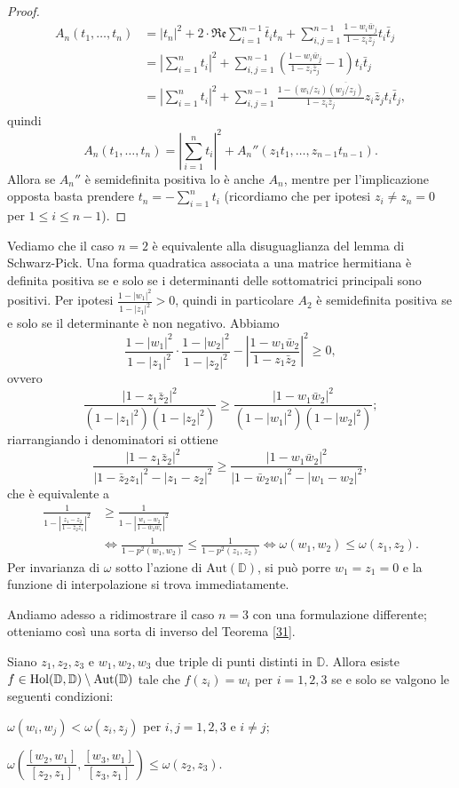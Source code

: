 \begin{proof}
\begin{align*}
    A_n(t_1,\dots,t_n)&=|t_n|^2+2\cdot\mathfrak{Re}\sum_{i=1}^{n-1}\bar{t}_it_n+\sum_{i,j=1}^{n-1}\frac{1-w_i\bar{w}_j}{1-z_i\bar{z}_j}t_i\bar{t}_j \\
    &=\left|\sum_{i=1}^n t_i\right|^2+\sum_{i,j=1}^{n-1}\left(\frac{1-w_i\bar{w}_j}{1-z_i\bar{z}_j}-1\right)t_i\bar{t}_j \\
    &=\left|\sum_{i=1}^n t_i\right|^2+\sum_{i,j=1}^{n-1}\frac{1-(w_i/z_i)\overline{(w_j/z_j)}}{1-z_i\bar{z}_j}z_i\bar{z}_jt_i\bar{t}_j,
  \end{align*}
  quindi
  $$A_n(t_1,\dots,t_n)=\left|\sum_{i=1}^n t_i\right|^2+A_n''(z_1t_1,\dots,z_{n-1}t_{n-1}).$$
  Allora se $A_n''$ è semidefinita positiva lo è anche $A_n$, mentre per l'implicazione opposta basta prendere $\displaystyle t_n=-\sum_{i=1}^n t_i$ (ricordiamo che per ipotesi $z_i\not=z_n=0$ per $1 \le i \le n-1$).
\end{proof}

Vediamo che il caso $n=2$ è equivalente alla disuguaglianza del lemma di Schwarz-Pick. Una forma quadratica associata a una matrice hermitiana è definita positiva se e solo se i determinanti delle sottomatrici principali sono positivi. Per ipotesi $\frac{1-|w_1|^2}{1-|z_1|^2} > 0$, quindi in particolare $A_2$ è semidefinita positiva se e solo se il determinante è non negativo. Abbiamo
$$\frac{1-|w_1|^2}{1-|z_1|^2}\cdot\frac{1-|w_2|^2}{1-|z_2|^2}-\left|\frac{1-w_1\bar{w}_2}{1-z_1\bar{z}_2}\right|^2 \ge 0,$$
ovvero
$$\frac{|1-z_1\bar{z}_2|^2}{(1-|z_1|^2)(1-|z_2|^2)} \ge \frac{|1-w_1\bar{w}_2|^2}{(1-|w_1|^2)(1-|w_2|^2)};$$
riarrangiando i denominatori si ottiene
$$\frac{|1-z_1\bar{z}_2|^2}{|1-\bar{z}_2z_1|^2-|z_1-z_2|^2} \ge \frac{|1-w_1\bar{w}_2|^2}{|1-\bar{w}_2w_1|^2-|w_1-w_2|^2},$$
che è equivalente a
\begin{align*}
  \frac{1}{1-\left|\frac{z_1-z_2}{1-\bar{z}_2z_1}\right|^2} & \ge \frac{1}{1-\left|\frac{w_1-w_2}{1-\bar{w}_2w_1}\right|^2} \\
  & \Leftrightarrow \frac{1}{1-p^2(w_1,w_2)} \le \frac{1}{1-p^2(z_1,z_2)} \Leftrightarrow \omega(w_1,w_2) \le \omega(z_1,z_2).
\end{align*}
Per invarianza di $\omega$ sotto l'azione di $\text{Aut}(\mathbb{D})$, si può porre $w_1=z_1=0$ e la funzione di interpolazione si trova immediatamente.

Andiamo adesso a ridimostrare il caso $n=3$ con una formulazione differente; otteniamo così una sorta di inverso del Teorema \ref{31}.

\begin{thm}
  Siano $z_1, z_2, z_3$ e $w_1, w_2, w_3$ due triple di punti distinti in $\mathbb{D}$. Allora esiste $f \in \normalfont{\text{Hol}}(\mathbb{D},\mathbb{D}) \setminus \normalfont{\text{Aut}}(\mathbb{D})$ tale che $f(z_i)=w_i$ per $i=1,2,3$ se e solo se valgono le seguenti condizioni:
  \begin{nlist}
    \item $\omega(w_i,w_j)<\omega(z_i,z_j)$ per $i,j=1,2,3$ e $i\not=j$;
    \item $\omega\left(\dfrac{[w_2,w_1]}{[z_2,z_1]},\dfrac{[w_3,w_1]}{[z_3,z_1]}\right) \le \omega(z_2,z_3)$.
  \end{nlist}
\end{thm}

